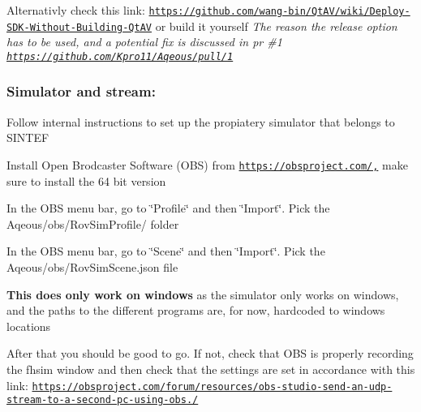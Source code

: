 Alternativly check this link\+: \href{https://github.com/wang-bin/QtAV/wiki/Deploy-SDK-Without-Building-QtAV}{\tt https\+://github.\+com/wang-\/bin/\+Qt\+A\+V/wiki/\+Deploy-\/\+S\+D\+K-\/\+Without-\/\+Building-\/\+Qt\+AV} or build it yourself {\itshape The reason the release option has to be used, and a potential fix is discussed in pr \#1 \href{https://github.com/Kpro11/Aqeous/pull/1}{\tt https\+://github.\+com/\+Kpro11/\+Aqeous/pull/1}}

\subsubsection*{Simulator and stream\+:}


\begin{DoxyEnumerate}
\item Follow internal instructions to set up the propiatery simulator that belongs to S\+I\+N\+T\+EF
\item Install Open Brodcaster Software (O\+BS) from \href{https://obsproject.com/,}{\tt https\+://obsproject.\+com/,} make sure to install the 64 bit version
\item In the O\+BS menu bar, go to \char`\"{}\+Profile\char`\"{} and then \char`\"{}\+Import\char`\"{}. Pick the Aqeous/obs/\+Rov\+Sim\+Profile/ folder
\item In the O\+BS menu bar, go to \char`\"{}\+Scene\char`\"{} and then \char`\"{}\+Import\char`\"{}. Pick the Aqeous/obs/\+Rov\+Sim\+Scene.\+json file
\end{DoxyEnumerate}

{\bfseries This does only work on windows} as the simulator only works on windows, and the paths to the different programs are, for now, hardcoded to windows locations

After that you should be good to go. If not, check that O\+BS is properly recording the fhsim window and then check that the settings are set in accordance with this link\+: \href{https://obsproject.com/forum/resources/obs-studio-send-an-udp-stream-to-a-second-pc-using-obs.455/}{\tt https\+://obsproject.\+com/forum/resources/obs-\/studio-\/send-\/an-\/udp-\/stream-\/to-\/a-\/second-\/pc-\/using-\/obs./} 